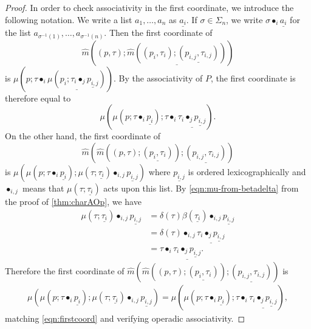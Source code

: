 \begin{proof}
In order to check associativity in the first coordinate, we introduce the following notation.
We write a list $a_1, \ldots, a_n$ as $\underline{a_i}$. If $\sigma \in \Sigma_n$, we write $\sigma \bullet_i \underline{a_i}$ for the list $a_{\sigma^{-1}(1)}, \ldots, a_{\sigma^{-1}(n)}$. Then the first coordinate of
\[
\hat{m}\left( (p,\tau); \underline{ \hat{m}\left( (p_i, \tau_i); \underline{ (p_{i,j}, \tau_{i,j})} \right) } \right)
\]
is $\mu\left( p; \tau \bullet_i \underline{ \mu(p_i; \tau_i \bullet_j \underline{p_{i,j}}) } \right)$. 
By the associativity of $P$, the first coordinate is therefore equal to
\begin{equation}\label{eqn:firstcoord}
\mu\left( \mu(p; \tau \bullet_i \underline{p_i}); \tau \bullet_i \underline{\tau_i \bullet_j \underline{p_{i,j}}} \right).
\end{equation}
On the other hand, the first coordinate of
\[
\hat{m}\left( \hat{m}\left( (p,\tau); \underline{ (p_i, \tau_i) }\right); \underline{ (p_{i,j}, \tau_{i,j}) } \right)
\]
is $\mu\left( \mu(p; \tau \bullet_i \underline{p_i}); \mu(\tau; \underline{\tau_i}) \bullet_{i,j} \underline{p_{i,j}} \right)$ where $\underline{p_{i,j}}$ is ordered lexicographically and $\bullet_{i,j}$ means that $\mu(\tau; \underline{\tau_i})$ acts upon this list. By \cref{eqn:mu-from-betadelta} from the proof of \cref{thm:charAOp}, we have
\begin{align*}
\mu(\tau; \underline{\tau_i}) \bullet_{i,j} \underline{p_{i,j}} & = \delta(\tau)\beta(\underline{\tau_i}) \bullet_{i,j} \underline{p_{i,j}} \\
& = \delta(\tau) \bullet_{i,j} \underline{ \tau_i \bullet_j \underline{p_{i,j}}} \\
& = \tau \bullet_i \underline{\tau_i \bullet_j \underline{p_{i,j}}}.
\end{align*}
Therefore the first coordinate of $\hat{m}\left( \hat{m}\left( (p,\tau); \underline{ (p_i, \tau_i) }\right); \underline{ (p_{i,j}, \tau_{i,j}) } \right)$ is
\begin{align*}
\mu\left( \mu(p; \tau \bullet_i \underline{p_i}); \mu(\tau; \underline{\tau_i}) \bullet_{i,j} \underline{p_{i,j}} \right) = \mu\left( \mu(p; \tau \bullet_i \underline{p_i}); \tau \bullet_i \underline{\tau_i \bullet_j \underline{p_{i,j}}} \right),
\end{align*}
matching \cref{eqn:firstcoord} and verifying operadic associativity.


\end{proof}
